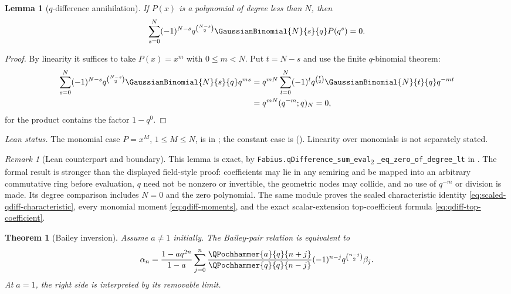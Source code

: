 \documentclass[11pt,a4paper,oneside,openany]{book}
\newtheorem{theorem}{Theorem}[chapter]
\newtheorem{lemma}[lemma]{Lemma}
\theoremstyle{definition}
\theoremstyle{remark}
\newtheorem{remark}[remark]{Remark}
\newcommand{\statusexact}{\textsf{\color{statusgreen}exact}}
\begin{document}
\begin{lemma}[$q$-difference annihilation]\label{lem:qdiff-annihilation}
If $P(x)$ is a polynomial of degree less than $N$, then
\[
 \sum_{s=0}^{N}(-1)^{N-s}q^{\binom{N-s}{2}}
 \GaussianBinomial{N}{s}{q} P(q^s)=0.
\]
\end{lemma}

\begin{proof}
By linearity it suffices to take $P(x)=x^m$ with $0\le m<N$.  Put $t=N-s$ and use the finite $q$-binomial theorem:
\begin{align*}
 \sum_{s=0}^{N}(-1)^{N-s}q^{\binom{N-s}{2}}\GaussianBinomial{N}{s}{q} q^{ms}
 &=q^{mN}\sum_{t=0}^{N}(-1)^tq^{\binom t2}\GaussianBinomial{N}{t}{q}q^{-mt}\\
 &=q^{mN}(q^{-m};q)_N=0,
\end{align*}
for the product contains the factor $1-q^0$.
\end{proof}

\emph{Lean status.}  The monomial case $P=x^M$, $1\le M\le N$, is
 in ; the
constant case is 
().  Linearity over monomials is not separately stated.


\begin{remark}[Lean counterpart and boundary]
This lemma is \statusexact, by
\texttt{Fabius.qDifference\_\allowbreak{}sum\_\allowbreak{}eval}\textsubscript{2}\allowbreak
\texttt{\_\allowbreak{}eq\_\allowbreak{}zero\_\allowbreak{}of\_\allowbreak{}degree\_\allowbreak{}lt} in
.  The formal result is stronger than the
displayed field-style proof: coefficients may lie in any semiring and be
mapped into an arbitrary commutative ring before evaluation, \(q\) need not
be nonzero or invertible, the geometric nodes may collide, and no use of
\(q^{-m}\) or division is made.  Its degree comparison includes \(N=0\) and
the zero polynomial.  The same module proves the scaled characteristic
identity \eqref{eq:scaled-qdiff-characteristic}, every monomial moment
\eqref{eq:qdiff-moments}, and the exact scalar-extension top-coefficient
formula \eqref{eq:qdiff-top-coefficient}.
\end{remark}

\begin{theorem}[Bailey inversion]\label{thm:bailey-inversion}
Assume $a\ne1$ initially.  The Bailey-pair relation is equivalent to
\[
 \alpha_n=\frac{1-aq^{2n}}{1-a}
 \sum_{j=0}^{n}
 \frac{\QPochhammer{a}{q}{n+j}}{\QPochhammer{q}{q}{n-j}}
 (-1)^{n-j}q^{\binom{n-j}{2}}\beta_j.
\]
At $a=1$, the right side is interpreted by its removable limit.
\end{theorem}
\end{document}
